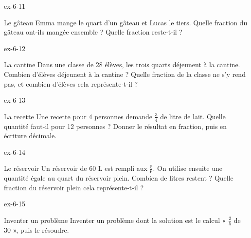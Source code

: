 \begin{blocLivre}{ex-6-11}\begin{exercice}[3]{Le gâteau}
Emma mange le quart d’un gâteau et Lucas le tiers. Quelle fraction du gâteau ont-ils mangée ensemble ? Quelle fraction reste-t-il ?
\end{exercice}\end{blocLivre}
\begin{blocLivre}{ex-6-12}\begin{exercice}[3]{La cantine}
Dans une classe de 28 élèves, les trois quarts déjeunent à la cantine. Combien d’élèves déjeunent à la cantine ? Quelle fraction de la classe ne s’y rend pas, et combien d’élèves cela représente-t-il ?
\end{exercice}\end{blocLivre}
\begin{blocLivre}{ex-6-13}\begin{exercice}[3]{La recette}
Une recette pour 4 personnes demande $\frac34$ de litre de lait. Quelle quantité faut-il pour 12 personnes ? Donner le résultat en fraction, puis en écriture décimale.
\end{exercice}\end{blocLivre}
\begin{blocLivre}{ex-6-14}\begin{exercice}[3]{Le réservoir}
Un réservoir de 60 L est rempli aux $\frac56$. On utilise ensuite une quantité égale au quart du réservoir plein. Combien de litres restent ? Quelle fraction du réservoir plein cela représente-t-il ?
\end{exercice}\end{blocLivre}
\begin{blocLivre}{ex-6-15}\begin{exercice}[3]{Inventer un problème}
Inventer un problème dont la solution est le calcul « $\frac25$ de 30 », puis le résoudre.
\end{exercice}\end{blocLivre}

\clearpage
